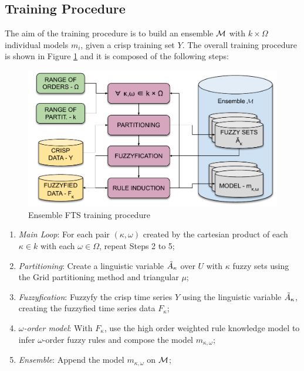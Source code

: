 %
\subsection{Training Procedure}
\label{sec:ensemblefts_training}

The aim of the training procedure is to build an ensemble $\mathcal{M}$ with $k\times\Omega$ individual models $m_i$, given a crisp training set $Y$. The overall training procedure is shown in Figure \ref{fig:ensemblefts_training} and it is composed of the following steps:

\begin{figure}[htb]
\includegraphics[width=\textwidth]{figures/ensemblefts_training.pdf}
\caption{Ensemble FTS training procedure}
\label{fig:ensemblefts_training}
\end{figure}

\begin{enumerate}
\item[Step 1] \textit{Main Loop}: For each pair $(\kappa,\omega)$ created by the cartesian product of each $\kappa \in k$ with each $\omega \in \Omega$, repeat Steps 2 to 5;
\item[Step 2] \textit{Partitioning}: Create a linguistic variable $\tilde{A}_\kappa$ over $U$ with $\kappa$ fuzzy sets using the Grid partitioning method and triangular $\mu$;
\item[Step 3] \textit{Fuzzyfication}: Fuzzyfy the crisp time series $Y$ using the linguistic variable $\tilde{A}_\kappa$, creating the fuzzyfied time series data $F_\kappa$;
\item[Step 4] \textit{$\omega$-order model}: With $F_\kappa$, use the high order weighted rule knowledge model to infer  $\omega$-order fuzzy rules and compose the model $m_{\kappa,\omega}$;
\item[Step 5)] \textit{Ensemble}: Append the model $m_{\kappa,\omega}$ on $\mathcal{M}$;
\end{enumerate}


